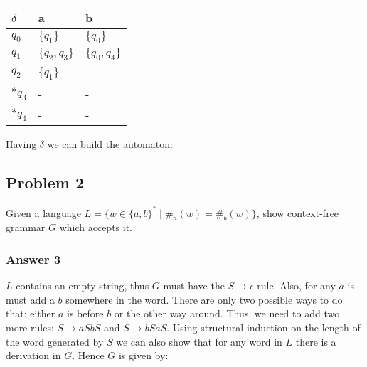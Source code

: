 \documentclass[11pt]{article}
\begin{document}
\begin{center}
\begin{tabular}{l|ll}
\(\delta\) & a & b\\
\hline
\(q_0\) & \(\{q_1\}\) & \(\{q_0\}\)\\
\(q_1\) & \(\{q_2, q_3\}\) & \(\{q_0,q_4\}\)\\
\(q_2\) & \(\{q_1\}\) & -\\
\(*q_3\) & - & -\\
\(*q_4\) & - & -\\
\end{tabular}
\end{center}

Having \(\delta\) we can build the automaton:


\subsection{Problem 2}
\label{sec:orgheadline5}
Given a language \(L=\{w \in \{a,b\}^*\;|\;\#_a(w)=\#_b(w)\}\), show
context-free grammar \(G\) which accepts it.

\subsubsection{Answer 3}
\label{sec:orgheadline4}
\(L\) contains an empty string, thus \(G\) must have the \(S \to \epsilon\) rule.
Also, for any \(a\) is must add a \(b\) somewhere in the word.  There are only
two possible ways to do that: either \(a\) is before \(b\) or the other way
around.  Thus, we need to add two more rules: \(S \to aSbS\) and \(S \to bSaS\).
Using structural induction on the length of the word generated by \(S\) we can
also show that for any word in \(L\) there is a derivation in \(G\).  Hence \(G\)
is given by:
\end{document}
